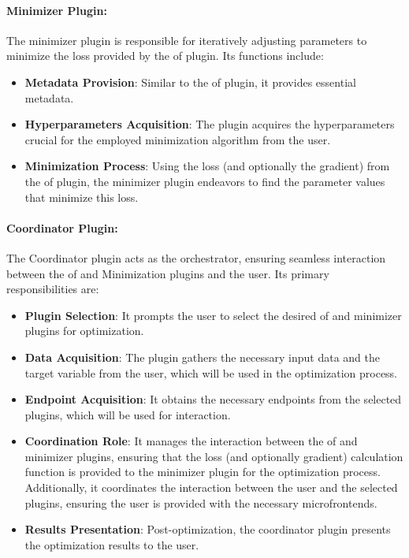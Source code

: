 \documentclass[
  a4paper,  %
  twoside,  %
  bibliography=totoc,
  headsepline,
  cleardoublepage=empty,
  parskip=half,
  draft=false
]{scrbook}
\begin{document}
\paragraph{Minimizer Plugin:}

The minimizer plugin is responsible for iteratively adjusting parameters to minimize the loss provided by the \gls{of} plugin.
Its functions include:

\begin{itemize}
\item \textbf{Metadata Provision}: Similar to the \gls{of} plugin, it provides essential metadata.
\item \textbf{Hyperparameters Acquisition}: The plugin acquires the hyperparameters crucial for the employed minimization algorithm from the user.
\item \textbf{Minimization Process}: Using the loss (and optionally the gradient) from the \gls{of} plugin, the minimizer plugin endeavors to find the parameter values that minimize this loss.
\end{itemize}

\paragraph{Coordinator Plugin:}

The Coordinator plugin acts as the orchestrator, ensuring seamless interaction between the \gls{of} and Minimization plugins and the user.
Its primary responsibilities are:

\begin{itemize}
\item \textbf{Plugin Selection}: It prompts the user to select the desired \gls{of} and minimizer plugins for optimization.
\item \textbf{Data Acquisition}: The plugin gathers the necessary input data and the target variable from the user, which will be used in the optimization process.
\item \textbf{Endpoint Acquisition}: It obtains the necessary endpoints from the selected plugins, which will be used for interaction.
\item \textbf{Coordination Role}: It manages the interaction between the \gls{of} and minimizer plugins, ensuring that the loss (and optionally gradient) calculation function is provided to the minimizer plugin for the optimization process.
Additionally, it coordinates the interaction between the user and the selected plugins, ensuring the user is provided with the necessary microfrontends.
\item \textbf{Results Presentation}: Post-optimization, the coordinator plugin presents the optimization results to the user.
\end{itemize}
\end{document}
